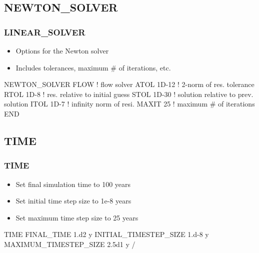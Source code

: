\documentclass{beamer}
\newcommand\bluecomment[1]{{{\color{blue} #1}}}
\begin{document}
\subsection{NEWTON\_SOLVER}

\begin{frame}[fragile]\frametitle{LINEAR\_SOLVER}

\begin{itemize}
\item Options for the Newton solver
\item Includes tolerances, maximum \# of iterations, etc.
\end{itemize}

\begin{semiverbatim}

NEWTON_SOLVER FLOW  \bluecomment{! flow solver}
  ATOL 1D-12        \bluecomment{! 2-norm of res. tolerance}  
  RTOL 1D-8         \bluecomment{! res. relative to initial guess}
  STOL 1D-30        \bluecomment{! solution relative to prev. solution}
  ITOL 1D-7         \bluecomment{! infinity norm of resi.}
  MAXIT 25          \bluecomment{! maximum \# of iterations}
END

\end{semiverbatim}

\end{frame}

\subsection{TIME}

\begin{frame}[fragile]\frametitle{TIME}

\begin{itemize}
\item Set final simulation time to 100 years
\item Set initial time step size to 1e-8 years
\item Set maximum time step size to 25 years
\end{itemize}


\begin{semiverbatim}

TIME
  FINAL_TIME 1.d2 y
  INITIAL_TIMESTEP_SIZE 1.d-8 y
  MAXIMUM_TIMESTEP_SIZE 2.5d1 y
/

\end{semiverbatim}

\end{frame}
\end{document}
